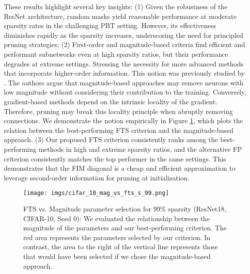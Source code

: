 These results highlight several key insights: (1) Given the robustness of the ResNet architecture, random masks yield reasonable performance at moderate sparsity rates in the challenging PBT setting. However, its effectiveness diminishes rapidly as the sparsity increases, underscoring the need for principled pruning strategies; (2) First-order and magnitude-based criteria find efficient and performant subnetworks even at high sparsity ratios, but their performance degrades at extreme settings. Stressing the necessity for more advanced methods that incorporate higher-order information. This notion was previously studied by \citet{yvinec2022singe}. The authors argue that magnitude-based approaches may remove neurons with low magnitude without considering their contribution to the training. Conversely, gradient-based methods depend on the intrinsic locality of the gradient. Therefore, pruning may break this locality principle when abruptly removing connections. We demonstrate the notion empirically in Figure \ref{fig:cifar_10_mag_vs_fts_s_99}, which plots the relation between the best-performing FTS criterion and the magnitude-based approach. (3) Our proposed FTS criterion consistently ranks among the best-performing methods in high and extreme sparsity ratios, and the alternative FP criterion consistently matches the top performer in the same settings. This demonstrates that the FIM diagonal is a cheap and efficient approximation to leverage second-order information for pruning at initialization.
\begin{figure}[htb]
    \centering
    \texttt{[image: imgs/cifar\_10\_mag\_vs\_fts\_s\_99.png]}
    \caption{FTS vs. Magnitude parameter selection for 99\% sparsity (ResNet18, CIFAR-10, Seed 0): We evaluated the relationship between the magnitude of the parameters and our best-performing criterion. The red area represents the parameters selected by our criterion. In contrast, the area to the right of the vertical line represents those that would have been selected if we chose the magnitude-based approach.}
    \label{fig:cifar_10_mag_vs_fts_s_99}
\end{figure}
